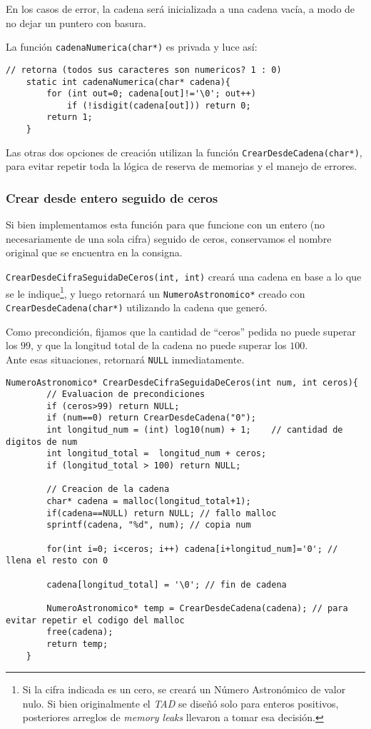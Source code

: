 \documentclass[a4paper, 12pt]{article}
\begin{document}
En los casos de error, la cadena será inicializada a una cadena vacía, a modo de no dejar un puntero con basura.

La función \verb|cadenaNumerica(char*)| es privada y luce así:

\begin{lstlisting}[style=C]
    // retorna (todos sus caracteres son numericos? 1 : 0)
    static int cadenaNumerica(char* cadena){
        for (int out=0; cadena[out]!='\0'; out++)
            if (!isdigit(cadena[out])) return 0;
        return 1;
    }
\end{lstlisting}

Las otras dos opciones de creación utilizan la función \verb|CrearDesdeCadena(char*)|, para evitar repetir toda la lógica de reserva de memorias y el manejo de errores.

\subsubsection{Crear desde entero seguido de ceros} \label{crear-cifra-ceros}

Si bien implementamos esta función para que funcione con un entero (no necesariamente de una sola cifra) seguido de ceros, conservamos el nombre original que se encuentra en la consigna.

\verb|CrearDesdeCifraSeguidaDeCeros(int, int)| creará una cadena en base a lo que se le indique\footnote{Si la cifra indicada es un cero, se creará un Número Astronómico de valor nulo. Si bien originalmente el \textit{TAD} se diseñó solo para enteros positivos, posteriores arreglos de \textit{memory leaks} llevaron a tomar esa decisión.}, y luego retornará un \verb|NumeroAstronomico*| creado con \verb|CrearDesdeCadena(char*)| utilizando la cadena que generó.

Como precondición, fijamos  que la cantidad de ``ceros'' pedida no puede superar los $99$, y que la longitud total de la cadena no puede superar los $100$.\\
Ante esas situaciones, retornará \verb|NULL| inmediatamente.

\begin{lstlisting}[style=C]
    NumeroAstronomico* CrearDesdeCifraSeguidaDeCeros(int num, int ceros){
        // Evaluacion de precondiciones
        if (ceros>99) return NULL;
        if (num==0) return CrearDesdeCadena("0");
        int longitud_num = (int) log10(num) + 1;    // cantidad de digitos de num
        int longitud_total =  longitud_num + ceros;
        if (longitud_total > 100) return NULL;
    
        // Creacion de la cadena
        char* cadena = malloc(longitud_total+1);
        if(cadena==NULL) return NULL; // fallo malloc
        sprintf(cadena, "%d", num); // copia num
    
        for(int i=0; i<ceros; i++) cadena[i+longitud_num]='0'; // llena el resto con 0
    
        cadena[longitud_total] = '\0'; // fin de cadena
        
        NumeroAstronomico* temp = CrearDesdeCadena(cadena); // para evitar repetir el codigo del malloc
        free(cadena);
        return temp;
    }
\end{lstlisting}
\end{document}
